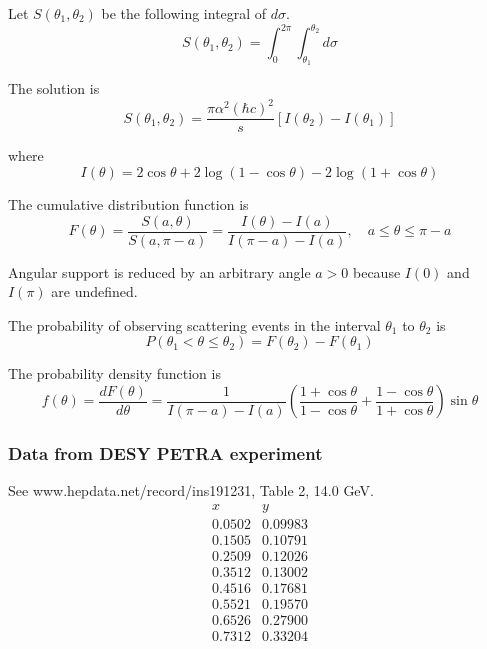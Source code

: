 Let $S(\theta_1,\theta_2)$ be the following integral of $d\sigma$.
\begin{equation*}
S(\theta_1,\theta_2)=\int_0^{2\pi}\int_{\theta_1}^{\theta_2}d\sigma
\end{equation*}

The solution is
\begin{equation*}
S(\theta_1,\theta_2)=\frac{\pi\alpha^2(\hbar c)^2}{s}
[I(\theta_2)-I(\theta_1)]
\end{equation*}

where
\begin{equation*}
I(\theta)=2\cos\theta+2\log(1-\cos\theta)-2\log(1+\cos\theta)
\end{equation*}

The cumulative distribution function is
\begin{equation*}
F(\theta)
=\frac{S(a,\theta)}{S(a,\pi-a)}
=\frac{I(\theta)-I(a)}{I(\pi-a)-I(a)},
\quad
a\le\theta\le\pi-a
\end{equation*}

Angular support is reduced by an arbitrary angle $a>0$ because $I(0)$ and $I(\pi)$ are undefined.

\bigskip
The probability of observing scattering events in the interval $\theta_1$ to $\theta_2$ is
\begin{equation*}
P(\theta_1<\theta\le \theta_2)=F(\theta_2)-F(\theta_1)
\end{equation*}

The probability density function is
\begin{equation*}
f(\theta)=\frac{dF(\theta)}{d\theta}
=\frac{1}{I(\pi-a)-I(a)}
\left(\frac{1+\cos\theta}{1-\cos\theta}+\frac{1-\cos\theta}{1+\cos\theta}\right)
\sin\theta
\end{equation*}

\subsubsection*{Data from DESY PETRA experiment}
See www.hepdata.net/record/ins191231, Table 2, 14.0 GeV.
\begin{equation*}
\begin{matrix}
x & y\\
0.0502 & 0.09983\\
0.1505 & 0.10791\\
0.2509 & 0.12026\\
0.3512 & 0.13002\\
0.4516 & 0.17681\\
0.5521 & 0.19570\\
0.6526 & 0.27900\\
0.7312 & 0.33204
\end{matrix}
\end{equation*}

